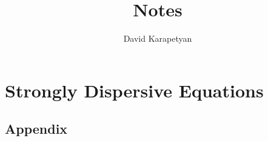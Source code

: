 \documentclass[12pt,reqno]{amsbook}
\numberwithin{equation}{chapter}  %
\begin{document}
\frontmatter
\title{Notes}
\author{David Karapetyan}

\date{}

\maketitle


\tableofcontents
\mainmatter
\part{Strongly Dispersive Equations}

%
%
%
%
%
%
%
%
%
\chapter{Appendix}

%
%
%
%
%
%
\backmatter

%
\end{document}
